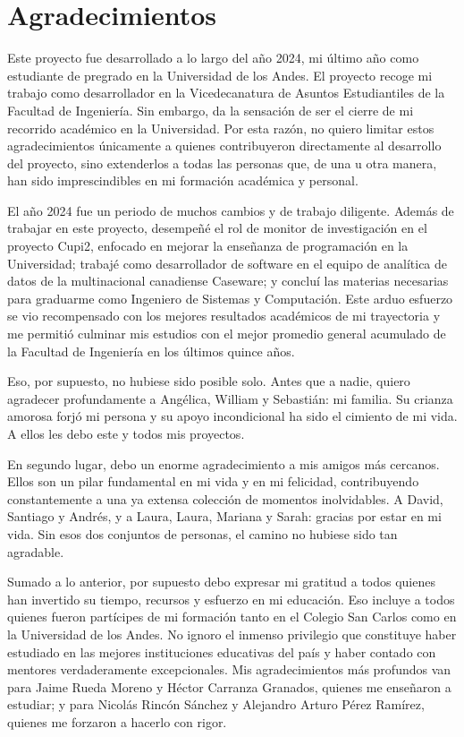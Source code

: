 \chapter*{Agradecimientos}

Este proyecto fue desarrollado a lo largo del año 2024, mi último año como estudiante de pregrado en la Universidad de los Andes. El proyecto recoge mi trabajo como desarrollador en la Vicedecanatura de Asuntos Estudiantiles de la Facultad de Ingeniería. Sin embargo, da la sensación de ser el cierre de mi recorrido académico en la Universidad. Por esta razón, no quiero limitar estos agradecimientos únicamente a quienes contribuyeron directamente al desarrollo del proyecto, sino extenderlos a todas las personas que, de una u otra manera, han sido imprescindibles en mi formación académica y personal.

El año 2024 fue un periodo de muchos cambios y de trabajo diligente. Además de trabajar en este proyecto, desempeñé el rol de monitor de investigación en el proyecto Cupi2, enfocado en mejorar la enseñanza de programación en la Universidad; trabajé como desarrollador de software en el equipo de analítica de datos de la multinacional canadiense Caseware; y concluí las materias necesarias para graduarme como Ingeniero de Sistemas y Computación. Este arduo esfuerzo se vio recompensado con los mejores resultados académicos de mi trayectoria y me permitió culminar mis estudios con el mejor promedio general acumulado de la Facultad de Ingeniería en los últimos quince años.

Eso, por supuesto, no hubiese sido posible solo. Antes que a nadie, quiero agradecer profundamente a Angélica, William y Sebastián: mi familia. Su crianza amorosa forjó mi persona y su apoyo incondicional ha sido el cimiento de mi vida. A ellos les debo este y todos mis proyectos.

En segundo lugar, debo un enorme agradecimiento a mis amigos más cercanos. Ellos son un pilar fundamental en mi vida y en mi felicidad, contribuyendo constantemente a una ya extensa colección de momentos inolvidables. A David, Santiago y Andrés, y a Laura, Laura, Mariana y Sarah: gracias por estar en mi vida. Sin esos dos conjuntos de personas, el camino no hubiese sido tan agradable.

Sumado a lo anterior, por supuesto debo expresar mi gratitud a todos quienes han invertido su tiempo, recursos y esfuerzo en mi educación. Eso incluye a todos quienes fueron partícipes de mi formación tanto en el Colegio San Carlos como en la Universidad de los Andes. No ignoro el inmenso privilegio que constituye haber estudiado en las mejores instituciones educativas del país y haber contado con mentores verdaderamente excepcionales. Mis agradecimientos más profundos van para Jaime Rueda Moreno y Héctor Carranza Granados, quienes me enseñaron a estudiar; y para Nicolás Rincón Sánchez y Alejandro Arturo Pérez Ramírez, quienes me forzaron a hacerlo con rigor.


